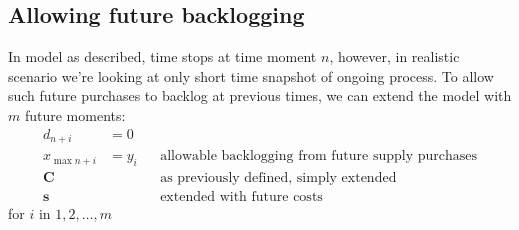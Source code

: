 \subsection{Allowing future backlogging}
\label{subs:Allowing future backlogging}
In model as described, time stops at time moment $n$, however, in realistic scenario we're looking at only short time snapshot of ongoing process. To allow such future purchases to backlog at previous times, we can extend the model with $m$ future moments:
\begin{align*}
    d_{n+i} &= 0  && \\
    x_{\max{n+i}} &= y_i  && \text{allowable backlogging from future supply purchases}\\
    \mathbf{C}  & && \text{as previously defined, simply extended} \\
    \mathbf{s} &&& \text{extended with future costs}
\end{align*}
for $i$ in $1, 2, \dotsc, m$
